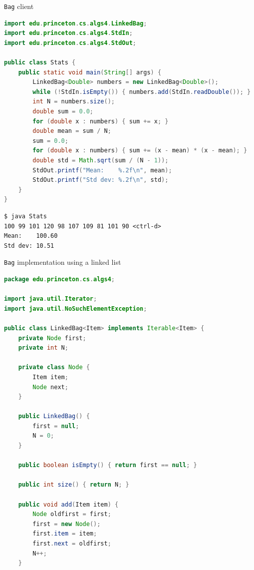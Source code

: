 \documentclass[8pt,a4paper,compress]{beamer}
\begin{document}
\begin{frame}[fragile]
\pause

\lstinline{Bag} client

\smallskip

\begin{lstlisting}[language=Java,style=focusin]
import edu.princeton.cs.algs4.LinkedBag;
import edu.princeton.cs.algs4.StdIn;
import edu.princeton.cs.algs4.StdOut;

public class Stats {
    public static void main(String[] args) {
        LinkedBag<Double> numbers = new LinkedBag<Double>();
        while (!StdIn.isEmpty()) { numbers.add(StdIn.readDouble()); }
        int N = numbers.size();
        double sum = 0.0;
        for (double x : numbers) { sum += x; }
        double mean = sum / N;
        sum = 0.0;
        for (double x : numbers) { sum += (x - mean) * (x - mean); }
        double std = Math.sqrt(sum / (N - 1));
        StdOut.printf("Mean:    %.2f\n", mean);
        StdOut.printf("Std dev: %.2f\n", std);
    }
}
\end{lstlisting}

\pause\bigskip

\begin{lstlisting}[language={},style=focusin]
$ java Stats
100 99 101 120 98 107 109 81 101 90 <ctrl-d>
Mean:    100.60
Std dev: 10.51
\end{lstlisting}
\end{frame}

\begin{frame}[fragile]
\pause

\lstinline{Bag} implementation using a linked list
\begin{lstlisting}[language=Java,style=focusin]
package edu.princeton.cs.algs4;

import java.util.Iterator;
import java.util.NoSuchElementException;

public class LinkedBag<Item> implements Iterable<Item> {
    private Node first;
    private int N;

    private class Node {
        Item item;
        Node next;
    }

    public LinkedBag() {
        first = null;
        N = 0;
    }

    public boolean isEmpty() { return first == null; }

    public int size() { return N; }

    public void add(Item item) {
        Node oldfirst = first;
        first = new Node();
        first.item = item;
        first.next = oldfirst;
        N++;
    }
\end{lstlisting}
\end{frame}
\end{document}
